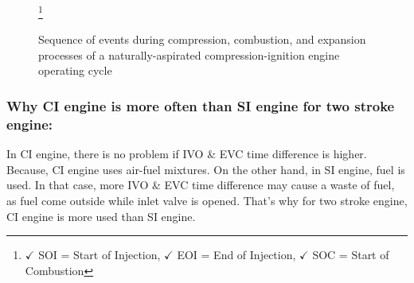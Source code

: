 \documentclass{article}
\begin{document}
\begin{figure}
	\centering
  
	\hfill
	
	\hfill
  
	\caption{Sequence of events during compression, combustion, and	expansion processes of a naturally-aspirated compression-ignition engine operating cycle}\footnote[1]{$\checkmark$ SOI = Start of Injection, $\checkmark$ EOI = End of Injection, $\checkmark$ SOC = Start of Combustion}
	\label{fig:overall}
  \end{figure}

 \subsubsection*{Why CI engine is more often than SI engine for two stroke engine:}
 In CI engine, there is no problem if IVO \& EVC time difference is higher. Because, CI engine uses air-fuel mixtures. On the other hand, in SI engine, fuel is used. In that case, more IVO \& EVC time difference may cause a waste of fuel, as fuel come outside while inlet valve is opened. That's why for two stroke engine, CI engine is more used than SI engine. 
\end{document}
